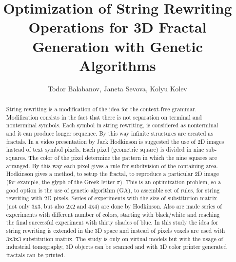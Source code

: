 \documentclass{llncs}
\begin{document}
\title{Optimization of String Rewriting Operations for 3D Fractal Generation with Genetic Algorithms}

\author{Todor Balabanov, Janeta Sevova, Kolyu Kolev}



\maketitle

\begin{abstract}
String rewriting is a modification of the idea for the context-free grammar. Modification consists in the fact that there is not separation on terminal and nonterminal symbols. Each symbol in string rewriting, is considered as nonterminal and it can produce longer sequence. By this way infinite structures are created as fractals. In a video presentation by Jack Hodkinson is suggested the use of 2D images instead of text symbol pixels. Each pixel (geometric square) is divided in nine sub-squares. The color of the pixel determine the pattern in which the nine squares are arranged. By this way each pixel gives a rule for subdivision of the containing area. Hodkinson gives a method, to setup the fractal, to reproduce a particular 2D image (for example, the glyph of the Greek letter $\pi$). This is an optimization problem, so a good option is the use of genetic algorithm (GA), to assemble set of rules, for string rewriting with 2D pixels. Series of experiments with the size of substitution matrix (not only 3x3, but also 2x2 and 4x4) are done by Hodkinson. Also are made series of experiments with different number of colors, starting with black/white and reaching the final successful experiment with thirty shades of blue. In this study the idea for string rewriting is extended in the 3D space and instead of pixels voxels are used with 3x3x3 substitution matrix. The study is only on virtual models but with the usage of industrial tomography, 3D objects can be scanned and with 3D color printer generated fractals can be printed.
\end{abstract}
\end{document}
